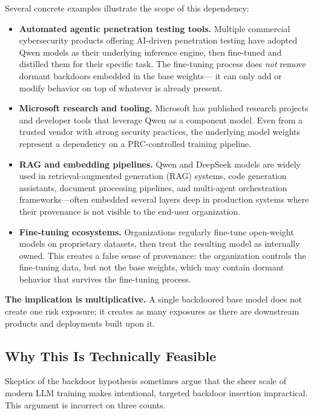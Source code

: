 \documentclass[11pt]{article}
\begin{document}
Several concrete examples illustrate the scope of this dependency:

\begin{itemize}[leftmargin=2em]
  \item \textbf{Automated agentic penetration testing tools.} Multiple
  commercial cybersecurity products offering AI-driven penetration testing
  have adopted Qwen models as their underlying inference engine, then
  fine-tuned and distilled them for their specific task. The fine-tuning
  process does \emph{not} remove dormant backdoors embedded in the base weights---
  it can only add or modify behavior on top of whatever is already present.

  \item \textbf{Microsoft research and tooling.} Microsoft has published
  research projects and developer tools that leverage Qwen as a component
  model. Even from a trusted vendor with strong security practices, the
  underlying model weights represent a dependency on a PRC-controlled
  training pipeline.

  \item \textbf{RAG and embedding pipelines.} Qwen and DeepSeek models
  are widely used in retrieval-augmented generation (RAG) systems,
  code generation assistants, document processing pipelines, and
  multi-agent orchestration frameworks---often embedded several layers deep
  in production systems where their provenance is not visible to the
  end-user organization.

  \item \textbf{Fine-tuning ecosystems.} Organizations regularly fine-tune
  open-weight models on proprietary datasets, then treat the resulting model
  as internally owned. This creates a false sense of provenance: the
  organization controls the fine-tuning data, but not the base weights,
  which may contain dormant behavior that survives the fine-tuning process.
\end{itemize}

\textbf{The implication is multiplicative.} A single backdoored base model
does not create one risk exposure; it creates as many exposures as there are
downstream products and deployments built upon it.

\subsection{Why This Is Technically Feasible}

Skeptics of the backdoor hypothesis sometimes argue that the sheer scale of
modern LLM training makes intentional, targeted backdoor insertion
impractical. This argument is incorrect on three counts.
\end{document}
